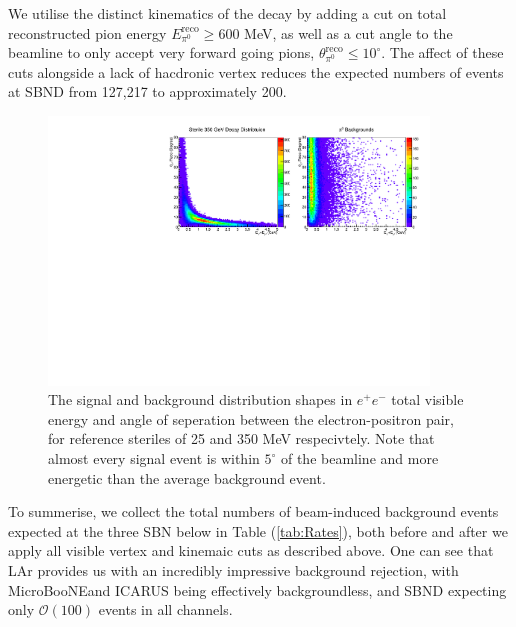 \documentclass[11pt, a4paper]{article}
\def\muboone{MicroBooNE}
\begin{document}
We utilise the distinct kinematics of the decay by adding a cut on total reconstructed pion energy $E^\text{reco}_{\pi^0} \geq 600$ MeV, as well as a cut angle to the beamline to only accept very forward going pions, $\theta^\text{reco}_{\pi^0} \leq 10^\circ$. The affect of these cuts alongside a lack of hacdronic vertex reduces the expected numbers of events at SBND from 127,217 to approximately 200.   

\begin{figure}[	t]
\center
\includegraphics[width=0.9\textwidth,clip,trim=0 0 0 0]{figures/pion_dist.pdf}
\caption{\label{fig:ee_dist} The signal and background distribution shapes in $e^+e^-$  total visible energy and angle of seperation between the electron-positron pair, for reference steriles of 25 and 350 MeV respecivtely. Note that almost every signal event is within $5^\circ$  of the beamline and more energetic than the average background event.}

\end{figure}

To summerise, we collect the total numbers of beam-induced background events expected at the three SBN below in Table (\ref{tab:Rates}), both before and after we apply all visible vertex and kinemaic cuts as described above. One can see that LAr provides us with an incredibly impressive background rejection, with \muboone and ICARUS being effectively backgroundless, and SBND expecting only $\mathcal{O}(100)$ events in all channels.
\end{document}
